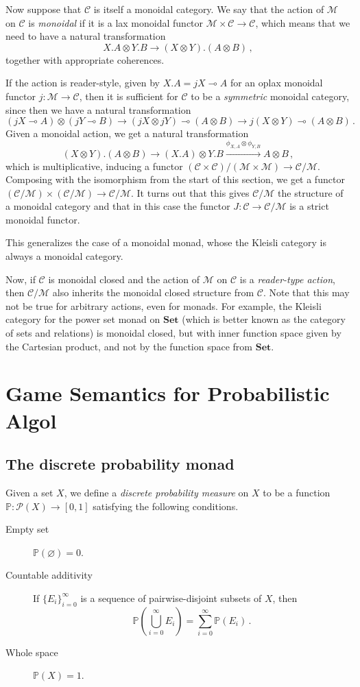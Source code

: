 \documentclass{svproc}
\newcommand\C{\mathcal{C}}
\newcommand\M{\mathcal{M}}
\newcommand\tensor\otimes
\renewcommand\implies\multimap
\let\emptyset\varnothing
\newcommand*\from{\colon}
\newcommand{\0}{{\mathtt{0}}} \newcommand{\com}{{\mathtt{com}}}
\newcommand{\catname}[1]{\mathbf{#1}}
\newcommand{\Set}{\catname{Set}}
\newcommand{\powerset}{\mathcal P}
\newcommand{\bP}{\mathbb{P}}
\renewcommand{\emptyset}{\varnothing}
\begin{document}
Now suppose that $\C$ is itself a monoidal category.  
We say that the action of $\M$ on $\C$ is \emph{monoidal} if it is a lax monoidal functor $\M\times\C\to\C$, which means that we need to have a natural transformation 
\[
  X.A\tensor Y.B\to (X\tensor Y).(A\tensor B)\,,
  \]
together with appropriate coherences.  

If the action is reader-style, given by $X.A = jX \implies A$ for an oplax monoidal functor $j\from \M\to \C$, then it is sufficient for $\C$ to be a \emph{symmetric} monoidal category, since then we have a natural transformation
\[
  (j X \implies A) \tensor (j Y \implies B)
  \rightarrow
  (j X \tensor j Y) \implies (A \tensor B)
  \rightarrow
  j (X\tensor Y) \implies (A \tensor B)\,.
  \]
Given a monoidal action, we get a natural transformation
\[
  (X\tensor Y).(A\tensor B)
  \rightarrow
  (X.A)\tensor Y.B
  \xrightarrow{\phi_{X,A}\tensor \phi_{Y,B}}
  A\tensor B\,,
  \]
which is multiplicative, inducing a functor $(\C\times\C)/(\M\times\M)\to \C/\M$.  
Composing with the isomorphism from the start of this section, we get a functor $(\C/\M)\times(\C/\M)\to\C/\M$.  
It turns out that this gives $\C/\M$ the structure of a monoidal category and that in this case the functor $J\from \C\to\C/\M$ is a strict monoidal functor.

This generalizes the case of a monoidal monad, whose the Kleisli category is always a monoidal category.

Now, if $\C$ is monoidal closed and the action of $\M$ on $\C$ is a \emph{reader-type action}, then $\C/\M$ also inherits the monoidal closed structure from $\C$.  
Note that this may not be true for arbitrary actions, even for monads.  
For example, the Kleisli category for the power set monad on $\Set$ (which is better known as the category of sets and relations) is monoidal closed, but with inner function space given by the Cartesian product, and not by the function space from $\Set$.

\section{Game Semantics for Probabilistic Algol}

\subsection{The discrete probability monad}

Given a set $X$, we define a \emph{discrete probability measure} on $X$ to be a function $\bP\from\powerset(X)\to[0,1]$ satisfying the following conditions.
\begin{description}
  \item[Empty set] $\bP(\emptyset) = 0$.
  \item[Countable additivity] If $\{E_i\}_{i=0}^\infty$ is a sequence of pairwise-disjoint subsets of $X$, then
    \[
      \bP\left(\bigcup_{i=0}^\infty E_i\right) = \sum_{i=0}^\infty \bP(E_i)\,.
      \]
  \item[Whole space] $\bP(X)=1$.
\end{description}
\end{document}
